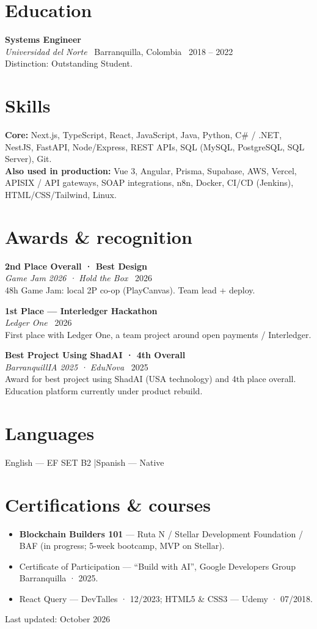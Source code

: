 \documentclass[10.5pt,a4paper]{article}
\newcommand{\Edu}[4]{%
  \noindent\textbf{#1}\\[-0.05em]
  {\small\textit{#2} \textbar\ #4 \textbar\ #3}\\[0.05em]
}
\newcommand{\Award}[4]{%
  \vspace{0.22em}%
  \noindent\textbf{#1}\\[-0.05em]
  {\small\textit{#2} \textbar\ #3}\\[0.05em]
  {\small #4}\par
}
\begin{document}
\vspace{2.5em}
\section{Education}
\Edu{Systems Engineer}{Universidad del Norte}{2018 -- 2022}{Barranquilla, Colombia}
Distinction: Outstanding Student.

\section{Skills}
\textbf{Core:} Next.js, TypeScript, React, JavaScript, Java, Python, C\# / .NET, NestJS,
FastAPI, Node/Express, REST APIs, SQL (MySQL, PostgreSQL, SQL Server), Git.\\
\textbf{Also used in production:} Vue 3, Angular, Prisma, Supabase, AWS, Vercel,
APISIX / API gateways, SOAP integrations, n8n, Docker, CI/CD (Jenkins), HTML/CSS/Tailwind,
Linux.

\section{Awards \& recognition}
\Award{2nd Place Overall · Best Design}{Game Jam 2026 · Hold the Box}{2026}{%
  48h Game Jam: local 2P co-op (PlayCanvas). Team lead + deploy.}
\Award{1st Place --- Interledger Hackathon}{Ledger One}{2026}{%
  First place with Ledger One, a team project around open payments / Interledger.}
\Award{Best Project Using ShadAI · 4th Overall}{BarranquillIA 2025 · EduNova}{2025}{%
  Award for best project using ShadAI (USA technology) and 4th place overall.
  Education platform currently under product rebuild.}

\section{Languages}
English --- EF SET B2 \quad|\quad Spanish --- Native

\section{Certifications \& courses}
\begin{itemize}
  \item \textbf{Blockchain Builders 101} --- Ruta N / Stellar Development Foundation / BAF
        (in progress; 5-week bootcamp, MVP on Stellar).
  \item Certificate of Participation --- ``Build with AI'', Google Developers Group
        Barranquilla · 2025.
  \item React Query --- DevTalles · 12/2023; HTML5 \& CSS3 --- Udemy · 07/2018.
\end{itemize}

\vspace{0.6em}
{\footnotesize\color{muted}Last updated: October 2026}
\end{document}
